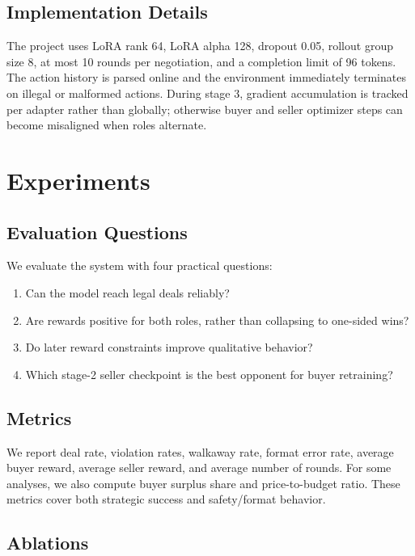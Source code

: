 \documentclass[11pt]{article}
\begin{document}
\subsection{Implementation Details}

The project uses LoRA rank 64, LoRA alpha 128, dropout 0.05, rollout group size 8, at most 10 rounds per negotiation, and a completion limit of 96 tokens. The action history is parsed online and the environment immediately terminates on illegal or malformed actions. During stage 3, gradient accumulation is tracked per adapter rather than globally; otherwise buyer and seller optimizer steps can become misaligned when roles alternate.

\section{Experiments}

\subsection{Evaluation Questions}

We evaluate the system with four practical questions:
\begin{enumerate}
    \item Can the model reach legal deals reliably?
    \item Are rewards positive for both roles, rather than collapsing to one-sided wins?
    \item Do later reward constraints improve qualitative behavior?
    \item Which stage-2 seller checkpoint is the best opponent for buyer retraining?
\end{enumerate}

\subsection{Metrics}

We report deal rate, violation rates, walkaway rate, format error rate, average buyer reward, average seller reward, and average number of rounds. For some analyses, we also compute buyer surplus share and price-to-budget ratio. These metrics cover both strategic success and safety/format behavior.

\subsection{Ablations}
\end{document}

